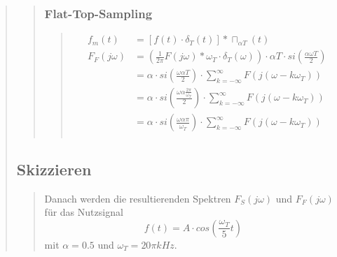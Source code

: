 \begin{quote}
\begin{quote}
        \subsubsection{Flat-Top-Sampling}
        \begin{quote}
            \begin{equation*}
                \begin{split}
                    f_m (t) &= [f (t) \cdot \delta_T (t)] \ast \sqcap_{\alpha T} (t)\\
                    F_F (j\omega) &= \left ( \frac{1}{2 \pi} F (j\omega) \ast \omega_T
                    \cdot \delta_T (\omega) \right) \cdot \alpha T \cdot si (\frac{\alpha \omega T}{2})\\
                    &= \alpha \cdot si \left( \frac{\omega \alpha T}{2} \right) \cdot \sum_{k=-\infty}^{\infty} F(j(\omega -
                    k\omega_T))\\
                    &= \alpha \cdot si \left( \frac{\omega \alpha \frac{2 \pi}{\omega_T}}{2} \right) \cdot
                    \sum_{k=-\infty}^{\infty} F(j(\omega - k\omega_T))\\
                    &= \alpha \cdot si \left( \frac{\omega \alpha \pi}{\omega_T} \right) \cdot
                    \sum_{k=-\infty}^{\infty} F(j(\omega - k\omega_T))\\
                \end{split}
            \end{equation*}
        \end{quote} %
    \end{quote}  %
    \subsection{Skizzieren}
    \begin{quote}
                
        Danach werden die resultierenden Spektren $F_S (j\omega)$ und $F_F (j\omega)$
        für das Nutzsignal
        \begin{equation*}
        f(t) = A \cdot cos(\frac{\omega_T}{5}t)     
        \end{equation*}
		    mit $\alpha = 0.5$ und $\omega_T = 20\pi kHz$.
        
        

\end{quote}
\end{quote}
